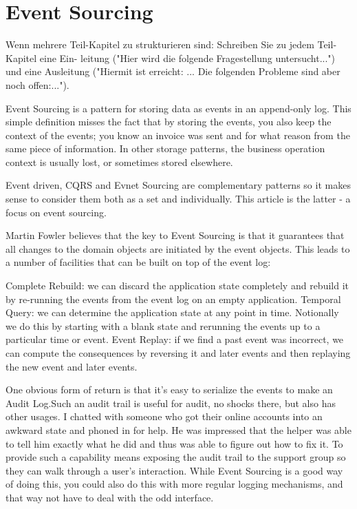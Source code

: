 %
\chapter{Event Sourcing}

Wenn mehrere Teil-Kapitel zu strukturieren sind: Schreiben Sie zu jedem Teil-Kapitel eine Ein- leitung ("Hier wird die folgende Fragestellung untersucht...") und eine Ausleitung ("Hiermit ist erreicht: ... Die folgenden Probleme sind aber noch offen:...").

Event Sourcing is a pattern for storing data as events in an append-only log. This simple definition misses the fact that by storing the events, you also keep the context of the events; you know an invoice was sent and for what reason from the same piece of information. In other storage patterns, the business operation context is usually lost, or sometimes stored elsewhere. %

Event driven, CQRS and Evnet Sourcing are complementary patterns so it makes sense to consider them both as a set and individually. This article is the latter - a focus on event sourcing.



Martin Fowler believes that the key to Event Sourcing is that it guarantees that all changes to the domain objects are initiated by the event objects. This leads to a number of facilities that can be built on top of the event log:

Complete Rebuild: we can discard the application state completely and rebuild it by re-running the events from the event log on an empty application.
Temporal Query: we can determine the application state at any point in time. Notionally we do this by starting with a blank state and rerunning the events up to a particular time or event.
Event Replay: if we find a past event was incorrect, we can compute the consequences by reversing it and later events and then replaying the new event and later events. %

One obvious form of return is that it's easy to serialize the events to make an Audit Log.Such an audit trail is useful for audit, no shocks there, but also has other usages. I chatted with someone who got their online accounts into an awkward state and phoned in for help. He was impressed that the helper was able to tell him exactly what he did and thus was able to figure out how to fix it. To provide such a capability means exposing the audit trail to the support group so they can walk through a user's interaction. While Event Sourcing is a good way of doing this, you could also do this with more regular logging mechanisms, and that way not have to deal with the odd interface. %

